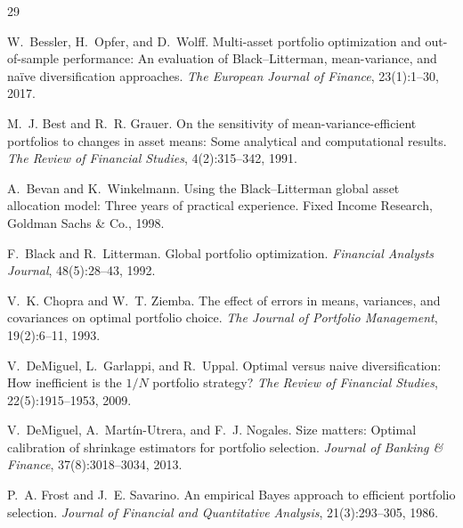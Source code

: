 \documentclass[a4paper,11pt]{article}
\theoremstyle{plain}
\theoremstyle{definition}
\begin{document}

\begin{thebibliography}{29}

W.~Bessler, H.~Opfer, and D.~Wolff.
\newblock Multi-asset portfolio optimization and out-of-sample
performance: An evaluation of Black--Litterman, mean-variance, and
na\"ive diversification approaches.
\newblock \emph{The European Journal of Finance}, 23(1):1--30, 2017.

M.~J. Best and R.~R. Grauer.
\newblock On the sensitivity of mean-variance-efficient portfolios to
changes in asset means: Some analytical and computational results.
\newblock \emph{The Review of Financial Studies}, 4(2):315--342, 1991.

A.~Bevan and K.~Winkelmann.
\newblock Using the Black--Litterman global asset allocation model:
Three years of practical experience.
\newblock Fixed Income Research, Goldman Sachs \& Co., 1998.

F.~Black and R.~Litterman.
\newblock Global portfolio optimization.
\newblock \emph{Financial Analysts Journal}, 48(5):28--43, 1992.

V.~K. Chopra and W.~T. Ziemba.
\newblock The effect of errors in means, variances, and covariances on
optimal portfolio choice.
\newblock \emph{The Journal of Portfolio Management}, 19(2):6--11, 1993.

V.~DeMiguel, L.~Garlappi, and R.~Uppal.
\newblock Optimal versus naive diversification: How inefficient is the
$1/N$ portfolio strategy?
\newblock \emph{The Review of Financial Studies}, 22(5):1915--1953, 2009.

V.~DeMiguel, A.~Mart\'in-Utrera, and F.~J. Nogales.
\newblock Size matters: Optimal calibration of shrinkage estimators for
portfolio selection.
\newblock \emph{Journal of Banking \& Finance}, 37(8):3018--3034, 2013.

P.~A. Frost and J.~E. Savarino.
\newblock An empirical Bayes approach to efficient portfolio selection.
\newblock \emph{Journal of Financial and Quantitative Analysis},
21(3):293--305, 1986.


\end{thebibliography}
\end{document}
